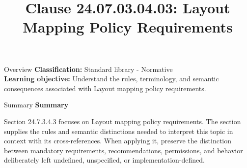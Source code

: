 \documentclass[10pt,letterpaper]{article}
\title{Clause 24.07.03.04.03: Layout Mapping Policy Requirements}
\author{}
\date{}
\begin{document}
\maketitle
\begin{CornellOverviewBox}{Overview}
\textbf{Classification:} Standard library - Normative\\[2pt]
\textbf{Learning objective:} Understand the rules, terminology, and semantic consequences associated with Layout mapping policy requirements.
\end{CornellOverviewBox}\begin{CornellSummaryBox}{Summary}
{\sffamily\bfseries\color{Accent} Summary}\par\vspace{3pt}Section 24.7.3.4.3 focuses on Layout mapping policy requirements. The section supplies the rules and semantic distinctions needed to interpret this topic in context with its cross-references. When applying it, preserve the distinction between mandatory requirements, recommendations, permissions, and behavior deliberately left undefined, unspecified, or implementation-defined.
\end{CornellSummaryBox}
\end{document}
